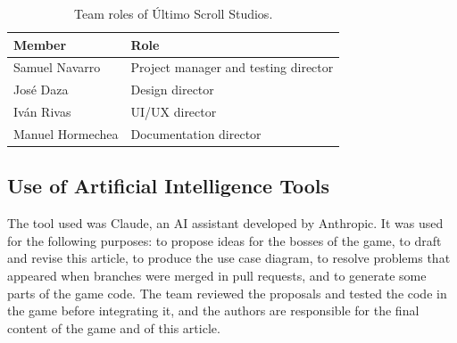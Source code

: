 \documentclass[conference]{IEEEtran}
\begin{document}
\begin{table}[t]
\caption{Team roles of \'Ultimo Scroll Studios.}
\label{p3-tab:roles}
\centering
\small
\begin{tabular}{ll}
\toprule
\textbf{Member} & \textbf{Role} \\
\midrule
Samuel Navarro & Project manager and testing director \\
Jos\'e Daza & Design director \\
Iv\'an Rivas & UI/UX director \\
Manuel Hormechea & Documentation director \\
\bottomrule
\end{tabular}
\end{table}

\subsection{Use of Artificial Intelligence Tools}
\label{p3-sec:ai}

The tool used was Claude, an AI assistant developed by Anthropic. It was used for the following purposes: to propose ideas for the bosses of the game, to draft and revise this article, to produce the use case diagram, to resolve problems that appeared when branches were merged in pull requests, and to generate some parts of the game code. The team reviewed the proposals and tested the code in the game before integrating it, and the authors are responsible for the final content of the game and of this article.



\end{document}
